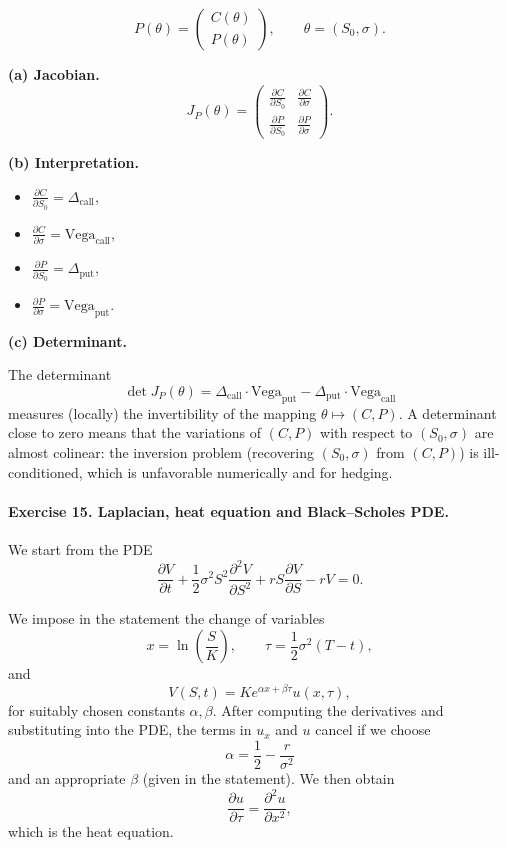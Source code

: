 \documentclass[11pt]{article}
\begin{document}
\[
P(\theta)=
\begin{pmatrix}
C(\theta)\\
P(\theta)
\end{pmatrix},
\qquad \theta=(S_0,\sigma).
\]

\textbf{(a) Jacobian.}
\[
J_P(\theta)=
\begin{pmatrix}
\displaystyle \frac{\partial C}{\partial S_0} & \displaystyle \frac{\partial C}{\partial \sigma} \\[8pt]
\displaystyle \frac{\partial P}{\partial S_0} & \displaystyle \frac{\partial P}{\partial \sigma}
\end{pmatrix}.
\]

\textbf{(b) Interpretation.}

\begin{itemize}
\item \(\frac{\partial C}{\partial S_0} = \Delta_{\text{call}}\),
\item \(\frac{\partial C}{\partial \sigma} = \text{Vega}_{\text{call}}\),
\item \(\frac{\partial P}{\partial S_0} = \Delta_{\text{put}}\),
\item \(\frac{\partial P}{\partial \sigma} = \text{Vega}_{\text{put}}\).
\end{itemize}

\textbf{(c) Determinant.}

The determinant
\[
\det J_P(\theta) = 
\Delta_{\text{call}}\cdot \text{Vega}_{\text{put}}
- \Delta_{\text{put}}\cdot \text{Vega}_{\text{call}}
\]
measures (locally) the invertibility of the mapping \(\theta\mapsto (C,P)\).  
A determinant close to zero means that the variations of \((C,P)\) with respect to \((S_0,\sigma)\) are almost colinear: the inversion problem (recovering \((S_0,\sigma)\) from \((C,P)\)) is ill-conditioned, which is unfavorable numerically and for hedging.

\bigskip

\paragraph{Exercise 15. Laplacian, heat equation and Black--Scholes PDE.}

We start from the PDE
\[
\frac{\partial V}{\partial t}
+ \frac{1}{2}\sigma^2 S^2 \frac{\partial^2 V}{\partial S^2}
+ r S \frac{\partial V}{\partial S}
- r V = 0.
\]

We impose in the statement the change of variables
\[
x = \ln\!\left(\frac{S}{K}\right), \qquad
\tau = \frac{1}{2}\sigma^2 (T - t),
\]
and
\[
V(S,t) = K e^{\alpha x + \beta \tau} u(x,\tau),
\]
for suitably chosen constants \(\alpha,\beta\). After computing the derivatives and substituting into the PDE, the terms in \(u_x\) and \(u\) cancel if we choose
\[
\alpha = \frac{1}{2} - \frac{r}{\sigma^2}
\]
and an appropriate \(\beta\) (given in the statement). We then obtain
\[
\frac{\partial u}{\partial \tau} = \frac{\partial^2 u}{\partial x^2},
\]
which is the heat equation.
\end{document}
